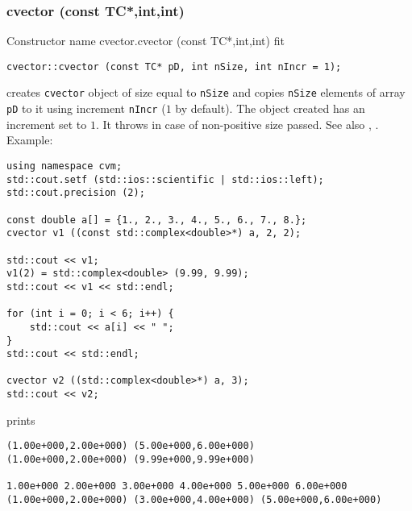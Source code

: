 \subsubsection{cvector (const TC*,int,int)}
Constructor%
\pdfdest name {cvector.cvector (const TC*,int,int)} fit
\begin{verbatim}
cvector::cvector (const TC* pD, int nSize, int nIncr = 1);
\end{verbatim}
creates  \verb"cvector" object of size equal to \verb"nSize"
and copies \verb"nSize" elements of
 array \verb"pD" to it using increment \verb"nIncr" ($1$ by default).
The object created has an increment set to $1$.
It throws  
in case of non-positive size passed.
See also , .
Example:
\begin{Verbatim}
using namespace cvm;
std::cout.setf (std::ios::scientific | std::ios::left);
std::cout.precision (2);

const double a[] = {1., 2., 3., 4., 5., 6., 7., 8.};
cvector v1 ((const std::complex<double>*) a, 2, 2);

std::cout << v1;
v1(2) = std::complex<double> (9.99, 9.99);
std::cout << v1 << std::endl;

for (int i = 0; i < 6; i++) {
    std::cout << a[i] << " ";
}
std::cout << std::endl;

cvector v2 ((std::complex<double>*) a, 3);
std::cout << v2;
\end{Verbatim}
prints
\begin{Verbatim}
(1.00e+000,2.00e+000) (5.00e+000,6.00e+000)
(1.00e+000,2.00e+000) (9.99e+000,9.99e+000)

1.00e+000 2.00e+000 3.00e+000 4.00e+000 5.00e+000 6.00e+000
(1.00e+000,2.00e+000) (3.00e+000,4.00e+000) (5.00e+000,6.00e+000)
\end{Verbatim}
\newpage




